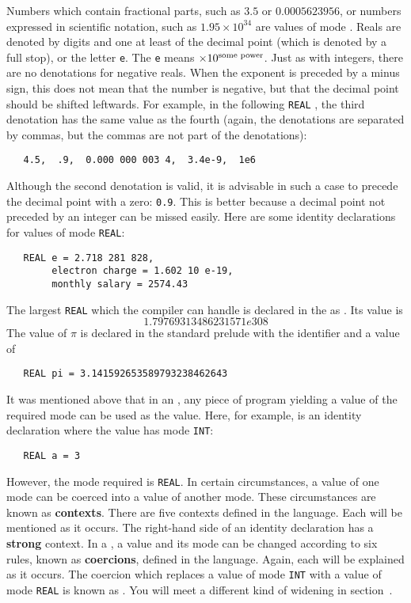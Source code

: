 Numbers which contain fractional parts, such as $3.5$ or 
$0.0005623956$, or numbers expressed in scientific notation, such as
$1.95\times10^{34}$ are values of mode .  Reals are
denoted by digits and one at least of the decimal point (which is
denoted by a full stop), or the letter \verb|e|.  The \verb|e| means
$\times10^{\hbox{\scriptsize some power}}$.  Just as with integers,
there are no denotations for negative reals.  When the exponent is
preceded by a minus sign, this does not mean that the number is
negative, but that the decimal point should be shifted leftwards.
For example, in the following \verb|REAL|
, the third denotation has the
same value as the fourth (again, the denotations are separated by
commas, but the commas are not part of the denotations):
\begin{verbatim}
   4.5,  .9,  0.000 000 003 4,  3.4e-9,  1e6
\end{verbatim}
\noindent
Although the second denotation is valid, it is advisable in such a
case to precede the decimal point with a zero: \verb|0.9|.  This is
better because a decimal point not preceded by an integer can be
missed easily.  Here are some identity declarations for values of
mode \verb|REAL|:
\begin{verbatim}
   REAL e = 2.718 281 828,
        electron charge = 1.602 10 e-19,
        monthly salary = 2574.43
\end{verbatim}
\noindent
The largest \verb|REAL| which the compiler can handle is declared in
the  as . Its value is
$$1.79769313486231571e308$$
The value of $\pi$ is declared in the
standard prelude with the identifier  and a value of
\begin{verbatim}
   REAL pi = 3.141592653589793238462643
\end{verbatim}

It was mentioned above that in an
, any piece of
program yielding a value of the required mode can be used as the
value. Here, for example, is an identity declaration where the value
has mode \verb|INT|:
\begin{verbatim}
   REAL a = 3
\end{verbatim}
\noindent
However, the mode required is \verb|REAL|. In certain circumstances,
a value of one mode can be coerced into a value of another mode.
These circumstances are known as \textbf{contexts}.  There are five
contexts defined in the language.  Each  will be
mentioned as it occurs.  The right-hand side of an identity
declaration has a \textbf{strong} context.  In a
, a value and its mode can be
changed according to six rules, known as \textbf{coercions}, defined
in the language.  Again, each  will be explained as it
occurs.  The coercion which replaces a value of mode \verb|INT| with
a value of mode \verb|REAL| is known as
.  You will
meet a different kind of widening in section~.

